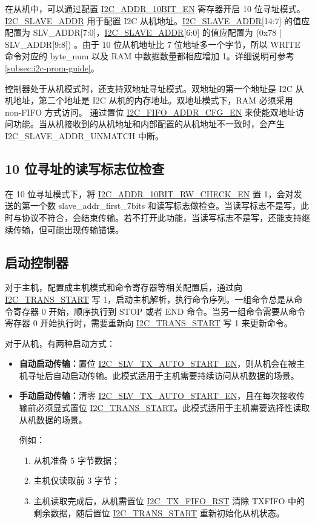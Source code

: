 \documentclass[main\_\_CN.tex]{subfiles}
\begin{document}
在从机中，可以通过配置 \hyperref[fielddesc:I2CADDR10BITEN]{I2C\_ADDR\_10BIT\_EN} 寄存器开启 10 位寻址模式。 \hyperref[fielddesc:I2CSLAVEADDR]{I2C\_SLAVE\_ADDR} 用于配置 I2C 从机地址。\hyperref[fielddesc:I2CSLAVEADDR]{I2C\_SLAVE\_ADDR}[14:7] 的值应配置为 SLV\_ADDR[7:0]，\hyperref[fielddesc:I2CSLAVEADDR]{I2C\_SLAVE\_ADDR}[6:0] 的值应配置为 (0x78 | SLV\_ADDR[9:8]) 。由于 10 位从机地址比 7 位地址多一个字节，所以 WRITE 命令对应的 byte\_num 以及 RAM 中数据数量都相应增加 1。详细说明可参考 \ref{subsec:i2c-prom-guide}。

控制器处于从机模式时，还支持双地址寻址模式。双地址的第一个地址是 I2C 从机地址，第二个地址是 I2C 从机的内存地址。双地址模式下，RAM 必须采用 non-FIFO 方式访问。
通过置位 \hyperref[fielddesc:I2CFIFOADDRCFGEN]{I2C\_FIFO\_ADDR\_CFG\_EN} 来使能双地址访问功能。当从机接收到的从机地址和内部配置的从机地址不一致时，会产生 I2C\_SLAVE\_ADDR\_UNMATCH 中断。

\subsection{10 位寻址的读写标志位检查}
在 10 位寻址模式下，将 \hyperref[fielddesc:I2CADDR10BITRWCHECKEN]{I2C\_ADDR\_10BIT\_RW\_CHECK\_EN} 置 1，会对发送的第一个数 slave\_addr\_first\_7bits 和读写标志做检查。当读写标志不是写，此时与协议不符合，会结束传输。若不打开此功能，当读写标志不是写，还能支持继续传输，但可能出现传输错误。

\subsection{启动控制器}
\label{subsubsec:i2c-start}
对于主机，配置成主机模式和命令寄存器等相关配置后，通过向 \hyperref[fielddesc:I2CTRANSSTART]{I2C\_TRANS\_START} 写 1，启动主机解析，执行命令序列。一组命令总是从命令寄存器 0 开始，顺序执行到 STOP 或者 END 命令。当另一组命令需要从命令寄存器 0 开始执行时，需要重新向 \hyperref[fielddesc:I2CTRANSSTART]{I2C\_TRANS\_START} 写 1 来更新命令。

对于从机，有两种启动方式：

\begin{itemize}
    \item \textbf{自动启动传输：}置位 \hyperref[fielddesc:I2CSLVTXAUTOSTARTEN]{I2C\_SLV\_TX\_AUTO\_START\_EN}，则从机会在被主机寻址后自动启动传输。此模式适用于主机需要持续访问从机数据的场景。
    \item \textbf{手动启动传输：}清零 \hyperref[fielddesc:I2CSLVTXAUTOSTARTEN]{I2C\_SLV\_TX\_AUTO\_START\_EN}，且在每次接收传输前必须显式置位 \hyperref[fielddesc:I2CTRANSSTART]{I2C\_TRANS\_START}。此模式适用于主机需要选择性读取从机数据的场景。

例如：
\begin{enumerate}
\item 从机准备 5 字节数据；
\item 主机仅读取前 3 字节；
\item 主机读取完成后，从机需置位 \hyperref[fielddesc:I2CTXFIFORST]{I2C\_TX\_FIFO\_RST} 清除 TXFIFO 中的剩余数据，随后置位 \hyperref[fielddesc:I2CTRANSSTART]{I2C\_TRANS\_START} 重新初始化从机状态。
\end{enumerate}

\end{itemize}
\end{document}
